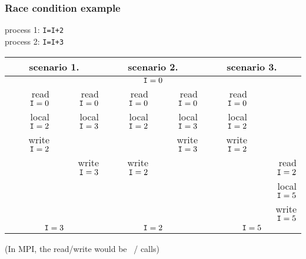 \begin{frame}[containsverbatim]\frametitle{Race condition example}
  \scriptsize
  \begin{tabbing}
    process 1: \texttt{I=I+2}\\
    process 2: \texttt{I=I+3}
  \end{tabbing}
  \begin{tabular}{|rr|rr|rr|}
    \hline
    \multicolumn{2}{|c|}{scenario 1.}& \multicolumn{2}{|c|}{scenario 2.}&
    \multicolumn{2}{|c|}{scenario 3.}\\ \hline
    \multicolumn{6}{|c|}{$\n{I}=0$}\\ \hline
    read $\n{I}=0$&read $\n{I}=0$&
    read $\n{I}=0$&read $\n{I}=0$&
    read $\n{I}=0$& \\
    local $\n{I}=2$&local $\n{I}=3$& 
    local $\n{I}=2$&local $\n{I}=3$&
    local $\n{I}=2$& \\
    write $\n{I}=2$& & &write $\n{I}=3$&write $\n{I}=2$& \\
    &write $\n{I}=3$&write $\n{I}=2$& & &read $\n{I}=2$\\
    &&&&&local $\n{I}=5$\\
    &&&&&write $\n{I}=5$\\
    \hline
    \multicolumn{2}{|c|}{$\n{I}=3$}& \multicolumn{2}{|c|}{$\n{I}=2$}&
    \multicolumn{2}{|c|}{$\n{I}=5$}\\ \hline
  \end{tabular}

  (In MPI, the read/write would be ~/  calls)
\end{frame}

